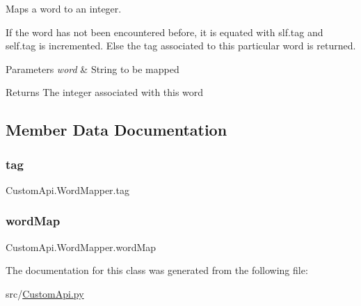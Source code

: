 Maps a word to an integer. 

If the word has not been encountered before, it is equated with slf.\+tag and self.\+tag is incremented. Else the tag associated to this particular word is returned.


\begin{DoxyParams}{Parameters}
{\em word} & String to be mapped \\
\hline
\end{DoxyParams}
\begin{DoxyReturn}{Returns}
The integer associated with this word 
\end{DoxyReturn}


\subsection{Member Data Documentation}
\mbox{\label{class_custom_api_1_1_word_mapper_a3827c888795971e8ec6fa62cf94ff9ee}} 
\subsubsection{\texorpdfstring{tag}{tag}}
{\footnotesize\ttfamily Custom\+Api.\+Word\+Mapper.\+tag}

\mbox{\label{class_custom_api_1_1_word_mapper_adffab40f8342bf2f07dce02ec1accb25}} 
\subsubsection{\texorpdfstring{word\+Map}{wordMap}}
{\footnotesize\ttfamily Custom\+Api.\+Word\+Mapper.\+word\+Map}



The documentation for this class was generated from the following file\+:\begin{DoxyCompactItemize}
\item 
src/\mbox{\hyperlink{_custom_api_8py}{Custom\+Api.\+py}}\end{DoxyCompactItemize}
